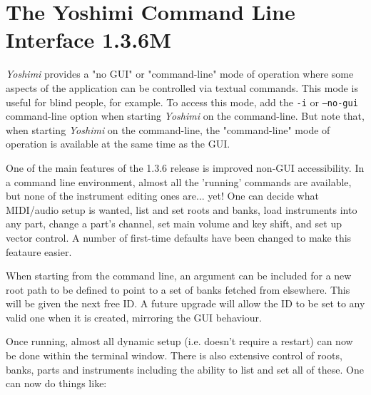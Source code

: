 %
%
%

\section{The Yoshimi Command Line Interface 1.3.6M}
\label{sec:command_line}

   \textsl{Yoshimi} provides a "no GUI" or "command-line" mode of operation
   where some aspects of the application can be controlled via textual commands.
   This mode is useful for blind people, for example.  To access this mode, add
   the \texttt{-i} or \texttt{--no-gui} command-line option when starting
   \textsl{Yoshimi} on the command-line.  But note that, when starting
   \textsl{Yoshimi} on the command-line, the "command-line" mode of operation is
   available at the same time as the GUI.

   One of the main features of the 1.3.6 release is improved non-GUI
   accessibility.  In a command line environment, almost all the 'running'
   commands are available, but none of the instrument editing ones are... yet!
   One can decide what MIDI/audio setup is wanted, list and set roots and banks,
   load instruments into any part, change a part's channel, set main volume and
   key shift, and set up vector control.  A number of first-time defaults have
   been changed to make this feataure easier.

   When starting from the command line, an argument can be included for a new
   root path to be defined to point to a set of banks fetched from elsewhere.
   This will be given the next free ID. A future upgrade will allow the ID to
   be set to any valid one when it is created, mirroring the GUI behaviour.

   Once running, almost all dynamic setup (i.e. doesn't require a restart) can now
   be done within the terminal window. There is also extensive control of roots,
   banks, parts and instruments including the ability to list and set all of
   these. One can now do things like:


